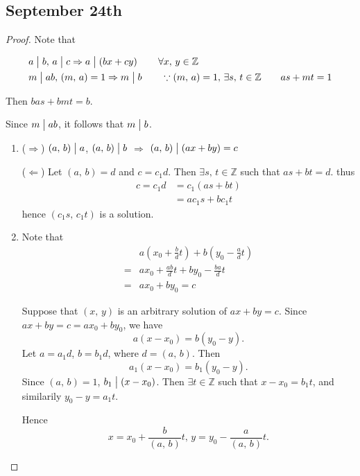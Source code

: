 
\subsection{September 24th}

\begin{proof}
    Note that

    \begin{align*}
        & a \bigm| b,\, a \bigm| c \Rightarrow a \bigm| \left(bx+cy\right) \qquad\forall x,\,y\in\mathbb{Z} \\
        & m \bigm| ab,\, \left(m,\,a\right)=1 \Rightarrow m\bigm| b \qquad \because \left(m,\,a\right)=1,\, \exists s,\,t \in \mathbb{Z} \qquad as+mt=1
    \end{align*}

    Then $bas+bmt=b$.

    Since $m\bigm| ab$, it follows that $m \bigm| b$.

    \begin{enumerate}
        \item ($\Rightarrow$)
        $\left(a,\,b\right)\bigm| a$, $\left(a,\,b\right)\bigm| b$ $\Rightarrow$
        $\left(a,\,b\right)\bigm| \left(ax+by\right)=c$

        ($\Leftarrow$)
        Let $\left(a,\,b\right)=d$ and $c=c_1d$. Then $\exists s,\,t \in \mathbb{Z}$ such that $as+bt = d$.
        thus
        \begin{align*}
            c=c_1d &= c_1\left(as+bt\right) \\
            &=ac_1s + bc_1t
        \end{align*}
        hence $\left(c_1s,\,c_1t\right)$ is a solution.

        \item Note that
        \begin{align*}
            &a\left(x_0+\frac{b}{d}t\right) + b\left(y_0-\frac{a}{d}t\right)\\
            =&ax_0+\frac{ab}{d}t+by_0-\frac{ba}{d}t \\
            =& ax_0+by_0=c
        \end{align*}
        
        Suppose that $\left(x,\,y\right)$ is an arbitrary solution of $ax+by=c$.
        Since $ax+by=c=ax_0+by_0$, we have
        \[
            a\left(x-x_0\right)=b\left(y_0-y\right).
        \]
        Let $a=a_1d$, $b=b_1d$, where $d=\left(a,\,b\right)$. Then
        \[
            a_1\left(x-x_0\right)=b_1\left(y_0-y\right).
        \]
        Since $\left(a,\,b\right)=1$, $b_1\bigm| \left(x-x_0\right)$. Then
        $\exists t \in \mathbb{Z}$ such that $x-x_0=b_1t$, and similarily $y_0-y=a_1t$.

        Hence \[
            x=x_0+\frac{b}{\left(a,\,b\right)}t,\, y=y_0-\frac{a}{\left(a,\,b\right)}t
        .\]
    \end{enumerate}
\end{proof}

